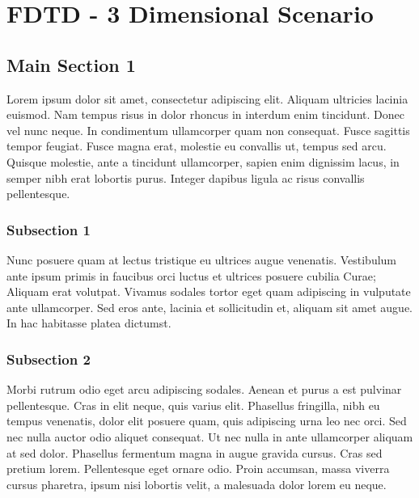 
\chapter{FDTD - 3 Dimensional Scenario} %

\label{Chapter4} %


\section{Main Section 1}

Lorem ipsum dolor sit amet, consectetur adipiscing elit. Aliquam ultricies lacinia euismod. Nam tempus risus in dolor rhoncus in interdum enim tincidunt. Donec vel nunc neque. In condimentum ullamcorper quam non consequat. Fusce sagittis tempor feugiat. Fusce magna erat, molestie eu convallis ut, tempus sed arcu. Quisque molestie, ante a tincidunt ullamcorper, sapien enim dignissim lacus, in semper nibh erat lobortis purus. Integer dapibus ligula ac risus convallis pellentesque.

\subsection{Subsection 1}

Nunc posuere quam at lectus tristique eu ultrices augue venenatis. Vestibulum ante ipsum primis in faucibus orci luctus et ultrices posuere cubilia Curae; Aliquam erat volutpat. Vivamus sodales tortor eget quam adipiscing in vulputate ante ullamcorper. Sed eros ante, lacinia et sollicitudin et, aliquam sit amet augue. In hac habitasse platea dictumst.


\subsection{Subsection 2}
Morbi rutrum odio eget arcu adipiscing sodales. Aenean et purus a est pulvinar pellentesque. Cras in elit neque, quis varius elit. Phasellus fringilla, nibh eu tempus venenatis, dolor elit posuere quam, quis adipiscing urna leo nec orci. Sed nec nulla auctor odio aliquet consequat. Ut nec nulla in ante ullamcorper aliquam at sed dolor. Phasellus fermentum magna in augue gravida cursus. Cras sed pretium lorem. Pellentesque eget ornare odio. Proin accumsan, massa viverra cursus pharetra, ipsum nisi lobortis velit, a malesuada dolor lorem eu neque.

